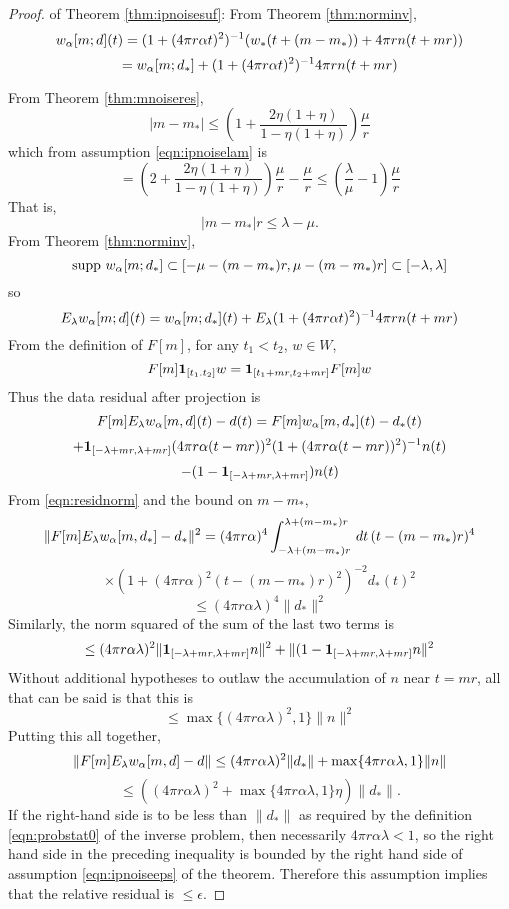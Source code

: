 \begin{proof} of Theorem \ref{thm:ipnoisesuf}:
From Theorem \ref{thm:norminv}, 
\[
  w_{\alpha}[m;d](t) = (1+ (4 \pi r \alpha t)^2)^{-1}(w_*(t+(m-m_*)) + 4\pi r 
  n(t+mr)) 
\]
\[
  = w_{\alpha}[m;d_*] + (1+ (4 \pi r \alpha t)^2)^{-1}4\pi r n(t+mr)
\]

From Theorem \ref{thm:mnoiseres},
\[
  |m-m_*| \le \left(1+\frac{2\eta(1+\eta)}{1-\eta(1+\eta)}\right)\frac{\mu}{r} 
\]
which from assumption \ref{eqn:ipnoiselam} is
\[
  =\left(2+\frac{2\eta(1+\eta)}{1-\eta(1+\eta)}\right)\frac{\mu}{r}
  -\frac{\mu}{r} \le \left(\frac{\lambda}{\mu}-1\right)\frac{\mu}{r}
\]
That is,
\[
  |m-m_*|r \le \lambda-\mu.
\]
From Theorem \ref{thm:norminv},
\[
  \mbox{supp }w_{\alpha}[m;d_*] \subset [-\mu-(m-m_*)r, \mu-(m-m_*)r]
  \subset [-\lambda,\lambda]
\]
so
\[
  E_{\lambda}w_{\alpha}[m;d](t) = w_{\alpha}[m;d_*](t) + E_{\lambda}(1+ (4 \pi r \alpha
  t)^2)^{-1}4\pi r n(t+mr)
\]
From the definition of $F[m]$, for any $t_1<t_2$, $w \in W$,  
\[
  F[m]{\bf 1}_{[t_1.t_2]}w = {\bf 1}_{[t_1+mr,t_2+mr]}F[m]w  
\]
Thus the data residual after projection is
\[
  F[m]E_{\lambda}w_{\alpha}[m,d](t) -d(t) = F[m]w_{\alpha}[m,d_*](t) -d_*(t)  
\]
\[
  + {\bf 1}_{[-\lambda+mr,\lambda+mr]}(4 \pi r \alpha (t-mr))^2 (1+ (4 \pi
  r \alpha (t-mr))^2)^{-1} n(t)
\]
\[
  -(1- {\bf 1}_{[-\lambda+mr,\lambda+mr]})n(t)
\]
From \ref{eqn:residnorm} and the bound on $m-m_*$,
\[
  \| F[m]E_{\lambda}w_{\alpha}[m,d_*] -d_*\|^2 = (4 \pi r \alpha)^4
  \int_{-\lambda+(m-m_*)r}^{\lambda+(m-m_*)r}\,dt\, (t-(m-m_*)r)^4
\]
\[
  \times (1+(4\pi r \alpha)^2 
  (t-(m-m_*)r)^2)^{-2}d_*(t)^2
\]
\[
  \le (4 \pi r \alpha \lambda)^4\|d_*\|^2
\]
Similarly, the norm squared of the sum of the last two terms is 
\[
  \le (4 \pi r \alpha \lambda)^2 \|{\bf 1}_{[-\lambda+mr,\lambda+mr]}
  n\|^2 + \|(1 - {\bf 1}_{[-\lambda+mr,\lambda+mr]}n\|^2
\]
Without additional hypotheses to outlaw the accumulation of $n$ near
$t=mr$, all that can be said is that this is
\[
  \le \max \{(4 \pi r \alpha \lambda)^2, 1\} \|n\|^2
\]
Putting this all together,
\[
  \|F[m]E_{\lambda}w_{\alpha}[m,d]-d\| \le (4 \pi r \alpha
  \lambda)^2\|d_*\| + \max \{4\pi r \alpha \lambda, 1\}\|n\|
\]
\[
  \le ((4 \pi r \alpha \lambda)^2 +\max \{4\pi r \alpha \lambda, 1\}
  \eta)\|d_*\|.
\]
If the right-hand side is to be less than $\|d_*\|$ as required by the
definition \ref{eqn:probstat0} of the inverse problem, then
necessarily $4\pi r\alpha \lambda < 1$, so the right hand side in the
preceding inequality is bounded by the right hand side of assumption
\ref{eqn:ipnoiseeps} of the theorem. Therefore this assumption implies
that the relative residual is $\le \epsilon$.
\end{proof}

